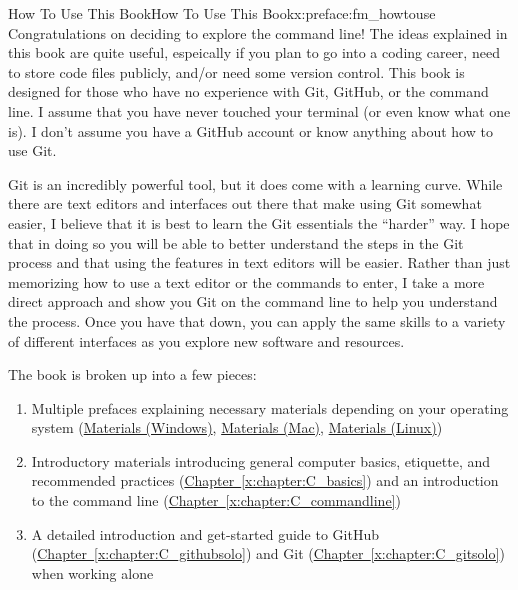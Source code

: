 \documentclass[oneside,10pt,]{book}
\newcommand{\xreffont}{\relax}
\begin{document}
%
%
\typeout{************************************************}
\typeout{************************************************}
%
\begin{preface}{How To Use This Book}{}{How To Use This Book}{}{}{x:preface:fm_howtouse}
Congratulations on deciding to explore the command line! The ideas explained in this book are quite useful, espeically if you plan to go into a coding career, need to store code files publicly, and\slash{}or need some version control. This book is designed for those who have no experience with Git, GitHub, or the command line. I assume that you have never touched your terminal (or even know what one is). I don't assume you have a GitHub account or know anything about how to use Git.%
\par
Git is an incredibly powerful tool, but it does come with a learning curve. While there are text editors and interfaces out there that make using Git somewhat easier, I believe that it is best to learn the Git essentials the ``harder'' way. I hope that in doing so you will be able to better understand the steps in the Git process and that using the features in text editors will be easier. Rather than just memorizing how to use a text editor or the commands to enter, I take a more direct approach and show you Git on the command line to help you understand the process. Once you have that down, you can apply the same skills to a variety of different interfaces as you explore new software and resources.%
\par
The book is broken up into a few pieces:%
\begin{enumerate}
\item{}Multiple prefaces explaining necessary materials depending on your operating system (\hyperref[x:preface:materials-windows]{Materials (Windows)}, \hyperref[x:preface:materials-mac]{Materials (Mac)}, \hyperref[x:preface:materials-linux]{Materials (Linux)})%
\item{}Introductory materials introducing general computer basics, etiquette, and recommended practices (\hyperref[x:chapter:C_basics]{Chapter~{\xreffont\ref{x:chapter:C_basics}}}) and an introduction to the command line (\hyperref[x:chapter:C_commandline]{Chapter~{\xreffont\ref{x:chapter:C_commandline}}})%
\item{}A detailed introduction and get-started guide to GitHub (\hyperref[x:chapter:C_githubsolo]{Chapter~{\xreffont\ref{x:chapter:C_githubsolo}}}) and Git (\hyperref[x:chapter:C_gitsolo]{Chapter~{\xreffont\ref{x:chapter:C_gitsolo}}}) when working alone%

\end{enumerate}
\end{preface}
\end{document}
